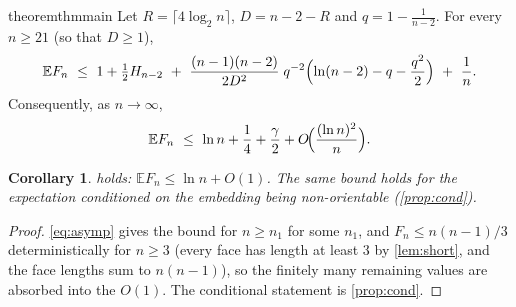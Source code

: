\documentclass[11pt,a4paper]{article}
\theoremstyle{plain}
\newtheorem{corollary}[theorem]{Corollary}
\theoremstyle{definition}
\theoremstyle{remark}
\newcommand{\E}{\mathbb E}
\begin{document}
\begin{restatable}{theorem}{thmmain}\label{thm:main}
Let $R=\lceil4\log_2n\rceil$, $D=n-2-R$ and $q=1-\frac1{n-2}$. For every $n\ge21$ (so that $D\ge1$),
\begin{equation}\label{eq:finite}
\E F_n\ \le\ 1+\tfrac12H_{n-2}\ +\ \frac{(n-1)(n-2)}{2D^2}\;q^{-2}\Bigl(\ln(n-2)-q-\frac{q^2}2\Bigr)\ +\ \frac1n .
\end{equation}
Consequently, as $n\to\infty$,
\begin{equation}\label{eq:asymp}
\E F_n\ \le\ \ln n+\frac14+\frac\gamma2+O\!\Bigl(\frac{(\ln n)^2}{n}\Bigr).
\end{equation}
\end{restatable}

\begin{corollary}\label{cor:95}
 holds: $\E F_n\le\ln n+O(1)$. The same bound holds for the expectation conditioned on the embedding being non-orientable (\cref{prop:cond}).
\end{corollary}
\begin{proof}
\eqref{eq:asymp} gives the bound for $n\ge n_1$ for some $n_1$, and $F_n\le n(n-1)/3$ deterministically for $n\ge3$ (every face has length at least $3$ by \cref{lem:short}, and the face lengths sum to $n(n-1)$), so the finitely many remaining values are absorbed into the $O(1)$. The conditional statement is \cref{prop:cond}.
\end{proof}
\end{document}
